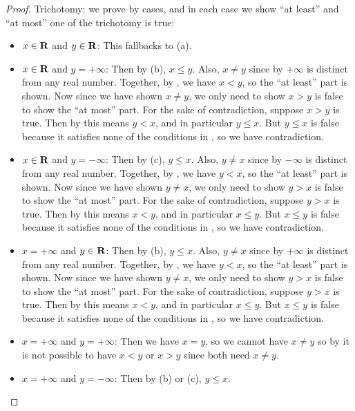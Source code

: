 \begin{proof}
Trichotomy: we prove by cases, and in each case we show ``at least'' and ``at most'' one of the trichotomy is true:
\begin{itemize}
\item \(x \in \mathbf{R}\) and \(y \in \mathbf{R}\): This fallbacks to (a).
\item \(x \in \mathbf{R}\) and \(y = +\infty\):
    Then by (b), \(x \le y\).
    Also, \(x \ne y\) since by  \(+\infty\) is distinct from any real number.
    Together, by , we have \(x < y\), so the ``at least'' part is shown.
    Now since we have shown \(x \ne y\), we only need to show \(x > y\) is false to show the ``at most'' part.
    For the sake of contradiction, suppose \(x > y\) is true. Then by  this means \(y < x\), and in particular \(y \le x\).
    But \(y \le x\) is false because it satisfies none of the conditions in , so we have contradiction.
\item \(x \in \mathbf{R}\) and \(y = -\infty\):
    Then by (c), \(y \le x\).
    Also, \(y \ne x\) since by  \(-\infty\) is distinct from any real number.
    Together, by , we have \(y < x\), so the ``at least'' part is shown.
    Now since we have shown \(y \ne x\), we only need to show \(y > x\) is false to show the ``at most'' part.
    For the sake of contradiction, suppose \(y > x\) is true. Then by  this means \(x < y\), and in particular \(x \le y\).
    But \(x \le y\) is false because it satisfies none of the conditions in , so we have contradiction.
\item \(x = +\infty\) and \(y \in \mathbf{R}\):
    Then by (b), \(y \le x\).
    Also, \(y \ne x\) since by  \(+\infty\) is distinct from any real number.
    Together, by , we have \(y < x\), so the ``at least'' part is shown.
    Now since we have shown \(y \ne x\), we only need to show \(y > x\) is false to show the ``at most'' part.
    For the sake of contradiction, suppose \(y > x\) is true. Then by  this means \(x < y\), and in particular \(x \le y\).
    But \(x \le y\) is false because it satisfies none of the conditions in , so we have contradiction.
\item \(x = +\infty\) and \(y = +\infty\):
    Then we have \(x = y\), so we cannot have \(x \ne y\) so by  it is not possible to have \(x < y\) or \(x > y\) since both need \(x \ne y\).
\item \(x = +\infty\) and \(y = -\infty\):
    Then by (b) or (c), \(y \le x\).

\end{itemize}
\end{proof}
